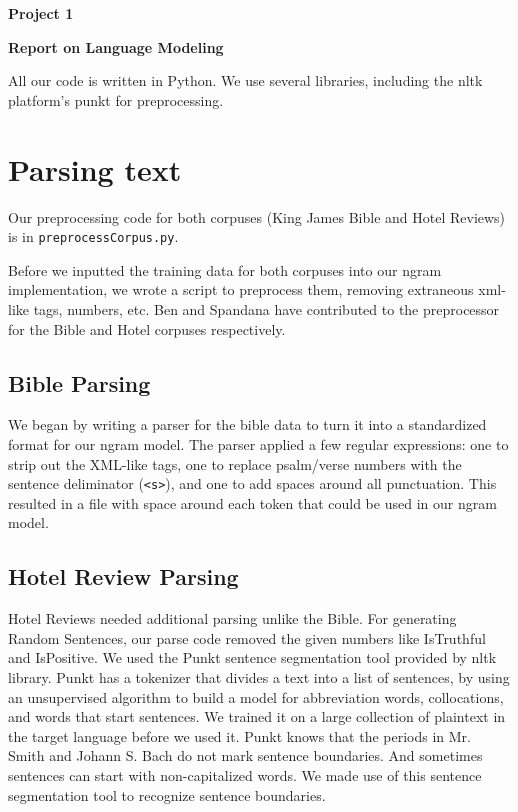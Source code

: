 \documentclass{article}
\begin{document}
\begin{center}\textbf{Project 1}\end{center}
\begin{center}\textbf{Report on Language Modeling}\end{center}

All our code is written in Python. We use several libraries, including the nltk platform's punkt for preprocessing.\par

\section{Parsing text}
Our preprocessing code for both corpuses (King James Bible and Hotel Reviews) is in \texttt{preprocessCorpus.py}.\par

Before we inputted the training data for both corpuses into our ngram implementation, we wrote a script to preprocess them, removing extraneous xml-like tags, numbers, etc. Ben and Spandana have contributed to the preprocessor for the Bible and Hotel corpuses respectively.\par

\subsection{Bible Parsing}

We began by writing a parser for the bible data to turn it into a standardized format for our ngram model. The parser applied a few regular expressions: one to strip out the XML-like tags, one to replace psalm/verse numbers with the sentence deliminator (\texttt{<s>}), and one to add spaces around all punctuation. This resulted in a file with space around each token that could be used in our ngram model. 

\subsection{Hotel Review Parsing}

Hotel Reviews needed additional parsing unlike the Bible. For generating Random Sentences, our parse code removed the given numbers like IsTruthful and IsPositive. We used the Punkt sentence segmentation tool provided by nltk library. Punkt has a tokenizer that divides a text into a list of sentences, by using an unsupervised algorithm to build a model for abbreviation words, collocations, and words that start sentences. We trained it on a large collection of plaintext in the target language before we used it. Punkt knows that the periods in Mr. Smith and Johann S. Bach do not mark sentence boundaries. And sometimes sentences can start with non-capitalized words. We made use of this sentence segmentation tool to recognize sentence boundaries.
\end{document}
